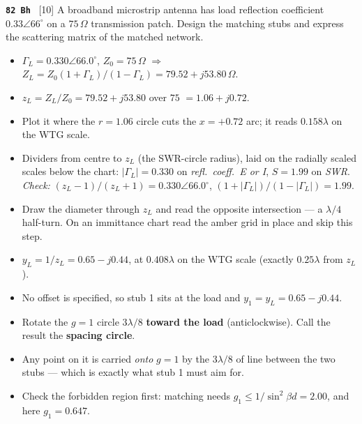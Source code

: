 \begin{asked}{\textbf{\texttt{82 Bh}} \ [10]}
A broadband microstrip antenna has load reflection coefficient $0.33\angle 66^\circ$ on a $75\,\Omega$ transmission patch. Design the matching stubs and express the scattering matrix of the matched network.
\end{asked}
\begin{itemize}
  \item $\Gamma_L = 0.330\angle 66.0^\circ$, $Z_0 = 75\,\Omega$ $\Rightarrow$ $Z_L = Z_0(1+\Gamma_L)/(1-\Gamma_L) = 79.52 + j53.80\,\Omega$.
\end{itemize}
\begin{itemize}
  \item $z_L = Z_L/Z_0 = 79.52 + j53.80$ over $75$ $=1.06 + j0.72$.
  \item Plot it where the $r = 1.06$ circle cuts the $x = +0.72$ arc; it reads $0.158\lambda$ on the WTG scale.
  \item Dividers from centre to $z_L$ (the SWR-circle radius), laid on the radially scaled scales below the chart: $|\Gamma_L| = 0.330$ on \emph{refl.\ coeff.\ E or I}, $S = 1.99$ on \emph{SWR}. \textit{Check:} $(z_L-1)/(z_L+1) = 0.330\angle 66.0^\circ$, $(1+|\Gamma_L|)/(1-|\Gamma_L|) = 1.99$.
\end{itemize}
\begin{itemize}
  \item Draw the diameter through $z_L$ and read the opposite intersection --- a $\lambda/4$ half-turn. On an immittance chart read the amber grid in place and skip this step.
  \item $y_L = 1/z_L = 0.65 - j0.44$, at $0.408\lambda$ on the WTG scale (exactly $0.25\lambda$ from $z_L$).
\end{itemize}
\begin{itemize}
  \item No offset is specified, so stub 1 sits at the load and $y_1 = y_L = 0.65 - j0.44$.
\end{itemize}
\begin{itemize}
  \item Rotate the $g=1$ circle $3\lambda/8$ \textbf{toward the load} (anticlockwise). Call the result the \textbf{spacing circle}.
  \item Any point on it is carried \emph{onto} $g=1$ by the $3\lambda/8$ of line between the two stubs --- which is exactly what stub 1 must aim for.
  \item Check the forbidden region first: matching needs $g_1 \le 1/\sin^2\beta d = 2.00$, and here $g_1 = 0.647$. \checkmark
\end{itemize}
